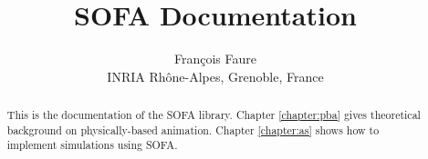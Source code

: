 \documentclass[a4paper,11pt]{report}
\title{SOFA Documentation}
\author{Fran\c{c}ois Faure\\ {\small INRIA Rh\^one-Alpes, Grenoble, France}}
\newcommand{\sofa}{SOFA}
\begin{document}
 
\maketitle

\begin{abstract}
This is the documentation of the SOFA library. Chapter \ref{chapter:pba} gives theoretical background on physically-based animation. Chapter \ref{chapter:as} shows how to implement simulations using \sofa.
\end{abstract}










\end{document}
